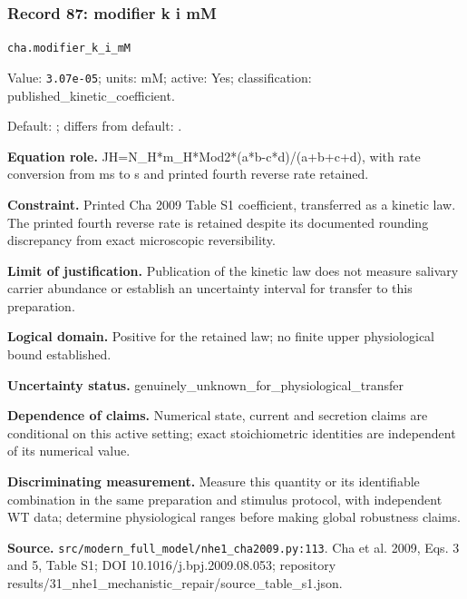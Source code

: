 \subsubsection*{Record 87: modifier k i mM}
{\small \nolinkurl{cha.modifier_k_i_mM}\par

Value: \texttt{3.07e-05}; units: mM; active: Yes; classification: published\_kinetic\_coefficient.\par

Default: ; differs from default: .\par

\textbf{Equation role.} JH=N\_H*m\_H*Mod2*(a*b-c*d)/(a+b+c+d), with rate conversion from ms to s and printed fourth reverse rate retained.\par

\textbf{Constraint.} Printed Cha 2009 Table S1 coefficient, transferred as a kinetic law. The printed fourth reverse rate is retained despite its documented rounding discrepancy from exact microscopic reversibility.\par

\textbf{Limit of justification.} Publication of the kinetic law does not measure salivary carrier abundance or establish an uncertainty interval for transfer to this preparation.\par

\textbf{Logical domain.} Positive for the retained law; no finite upper physiological bound established.\par

\textbf{Uncertainty status.} genuinely\_unknown\_for\_physiological\_transfer\par

\textbf{Dependence of claims.} Numerical state, current and secretion claims are conditional on this active setting; exact stoichiometric identities are independent of its numerical value.\par

\textbf{Discriminating measurement.} Measure this quantity or its identifiable combination in the same preparation and stimulus protocol, with independent WT data; determine physiological ranges before making global robustness claims.\par

\textbf{Source.} \nolinkurl{src/modern_full_model/nhe1_cha2009.py:113}. Cha et al. 2009, Eqs. 3 and 5, Table S1; DOI 10.1016/j.bpj.2009.08.053; repository results/31\_nhe1\_mechanistic\_repair/source\_table\_s1.json.\par}


